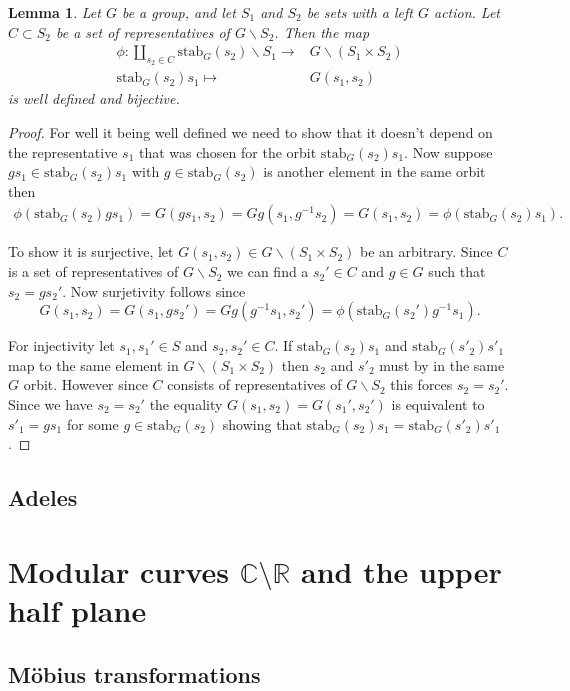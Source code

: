 \documentclass[a4paper,12pt,reqno]{amsart}
\newcommand{\field}[1]{\mathbb{#1}}  %
\newcommand{\R}{\field{R}} %
\newcommand{\C}{\field{C}} %
\newcommand{\stab}[2]{\text{stab}_{#1}(#2)}
\newtheorem{lemma}{Lemma}
\theoremstyle{definition}
\numberwithin{lemma}{section}
\numberwithin{equation}{section}
\numberwithin{figure}{section}
\begin{document}
\begin{lemma}
	Let $G$ be a group, and let $S_1$ and $S_2$ be sets with a left $G$ action. Let $C \subset S_2$ be a set of representatives of $G\backslash S_2$.
	Then the map \begin{align*}
	\phi : \coprod_{s_2 \in C} \stab{G}{s_2}\backslash S_1 \to& G \backslash(S_1 \times S_2)\\
	 \stab{G}{s_2}s_1\mapsto& G(s_1,s_2)
	\end{align*}
	is well defined and bijective.
\end{lemma}
\begin{proof}
For well it being well defined we need to show that it doesn't depend on the representative $s_1$ that was chosen for the orbit $\stab{G}{s_2}s_1$. Now suppose $gs_1 \in \stab{G}{s_2}s_1$ with $g \in \stab{G}{s_2}$ is another element in the same orbit then \begin{align*}\phi(\stab{G}{s_2}gs_1) = G(gs_1,s_2)=Gg(s_1,g^{-1}s_2)=G(s_1,s_2)=\phi(\stab{G}{s_2}s_1). \end{align*}

To show it is surjective, let $G(s_1,s_2) \in G\backslash(S_1 \times S_2)$ be an arbitrary. Since $C$ is a set of representatives of $G\backslash S_2$ we can find a $s_2' \in C$ and $g \in G$ such that $s_2=gs_2'$. Now surjetivity follows since $$G(s_1,s_2)=G(s_1,gs_2')=Gg(g^{-1}s_1,s_2') =  \phi(\stab{G}{s_2'}g^{-1}s_1).$$

For injectivity let $s_1, s_1' \in S$ and $s_2, s_2' \in C$. If  $\stab{G}{s_2}s_1$ and $\stab{G}{s'_2}s'_1$ map to the same element in $G\backslash(S_1 \times S_2)$ then $s_2$ and $s'_2$ must by in the same $G$ orbit. However since $C$ consists of representatives of $G \backslash S_2$ this forces $s_2 = s_2'$. Since we have $s_2=s_2'$ the equality $G(s_1,s_2) = G(s_1',s_2')$ is equivalent to $s'_1=gs_1$ for some $g \in \stab{G}{s_2}$ showing that $\stab{G}{s_2}s_1=\stab{G}{s'_2}s'_1$.
\end{proof}

\subsection{Adeles}


\section{Modular curves $\C\setminus \R$ and the upper half plane}

\subsection{M\"obius transformations}
\end{document}
